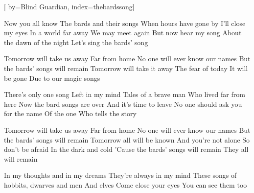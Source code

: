 
[%
    by={Blind Guardian},
    index={thebardssong}]


    \label{thebardssong}

    \beginverse
        Now you all know
        The bards and their songs
        When hours have gone by
        I'll close my eyes
        In a world far away
        We may meet again
        But now hear my song
        About the dawn of the night
        Let's sing the bards' song
    \endverse

    \beginchorus
        Tomorrow will take us away
        Far from home
        No one will ever know our names
        But the bards' songs will remain
        Tomorrow will take it away
        The fear of today
        It will be gone
        Due to our magic songs
    \endchorus

    \beginverse
        There's only one song
        Left in my mind
        Tales of a brave man
        Who lived far from here
        Now the bard songs are over
        And it's time to leave
        No one should ask you for the name
        Of the one
        Who tells the story
    \endverse

    \beginchorus
        Tomorrow will take us away
        Far from home
        No one will ever know our names
        But the bards' songs will remain
        Tomorrow all will be known
        And you're not alone
        So don't be afraid
        In the dark and cold
        'Cause the bards' songs will remain
        They all will remain
    \endchorus

    \beginverse*
        In my thoughts and in my dreams
        They're always in my mind
        These songs of hobbits, dwarves and men
        And elves
        Come close your eyes
        You can see them too
    \endverse
\endsong
